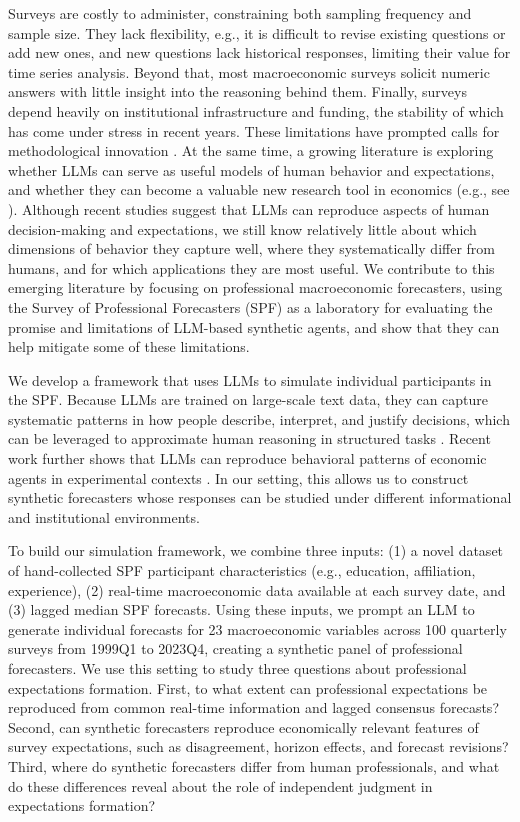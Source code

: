 \documentclass[11pt,letterpaper]{scrartcl}
\begin{document}
Surveys are costly to administer, constraining both sampling frequency and sample size. They lack flexibility, e.g., it is difficult to revise existing questions or add new ones, and new questions lack historical responses, limiting their value for time series analysis. Beyond that, most macroeconomic surveys solicit numeric answers with little insight into the reasoning behind them. Finally, surveys depend heavily on institutional infrastructure and funding, the stability of which has come under stress in recent years. These limitations have prompted calls for methodological innovation \citep{caplin2025}. At the same time, a growing literature is exploring whether LLMs can serve as useful models of human behavior and expectations, and whether they can become a valuable new research tool in economics (e.g., see \citealp{jackson2026aibehavioralscience}). Although recent studies suggest that LLMs can reproduce aspects of human decision-making and expectations, we still know relatively little about which dimensions of behavior they capture well, where they systematically differ from humans, and for which applications they are most useful. We contribute to this emerging literature by focusing on professional macroeconomic forecasters, using the Survey of Professional Forecasters (SPF) as a laboratory for evaluating the promise and limitations of LLM-based synthetic agents, and show that they can help mitigate some of these limitations. 

We develop a framework that uses LLMs to simulate individual participants in the SPF. Because LLMs are trained on large-scale text data, they can capture systematic patterns in how people describe, interpret, and justify decisions, which can be leveraged to approximate human reasoning in structured tasks \citep{suri2024large, niu2024large}. Recent work further shows that LLMs can reproduce behavioral patterns of economic agents in experimental contexts \citep[e.g.,][]{horton2023large, hansen2025financial, kazinnik2023bank, zarifhonarvar2024experimental}. In our setting, this allows us to construct synthetic forecasters whose responses can be studied under different informational and institutional environments.

To build our simulation framework, we combine three inputs: (1) a novel dataset of hand-collected SPF participant characteristics (e.g., education, affiliation, experience), (2) real-time macroeconomic data available at each survey date, and (3) lagged median SPF forecasts. Using these inputs, we prompt an LLM to generate individual forecasts for 23 macroeconomic variables across 100 quarterly surveys from 1999Q1 to 2023Q4, creating a synthetic panel of professional forecasters.
We use this setting to study three questions about professional expectations formation. First, to what extent can professional expectations be reproduced from common real-time information and lagged consensus forecasts? Second, can synthetic forecasters reproduce economically relevant features of survey expectations, such as disagreement, horizon effects, and forecast revisions? 
Third, where do synthetic forecasters differ from human professionals, and what do these differences reveal about the role of independent judgment in expectations formation?
 
\end{document}
